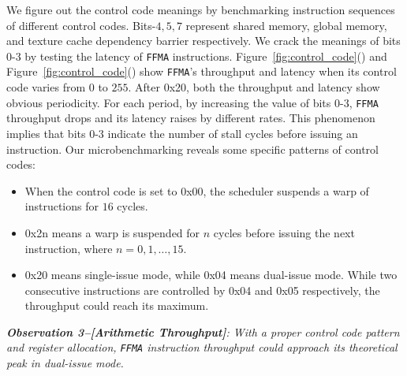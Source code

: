 We figure out the control code meanings by benchmarking instruction sequences of different control codes.
Bits-$4, 5, 7$ represent shared memory, global memory, and texture cache dependency barrier respectively.
We crack the meanings of bits $0$-$3$ by testing the latency of {\tt FFMA} instructions.
Figure~\ref{fig:control_code}() and
Figure~\ref{fig:control_code}() show {\tt FFMA}'s throughput and latency when its control code varies from $0$ to $255$.
After 0x20, both the throughput and latency show obvious periodicity.
For each period, by increasing the value of bits $0$-$3$, {\tt FFMA} throughput drops and its latency raises by different rates. 
This phenomenon implies that bits $0$-$3$ indicate the number of stall cycles before issuing
an instruction.
Our microbenchmarking reveals some specific patterns of control codes:

\begin{itemize}
\item When the control code is set to 0x00, the scheduler suspends a warp of instructions for $16$ cycles.
\item 0x2n means a warp is suspended for $n$ cycles before issuing the next instruction, where $n=0, 1,\dots, 15$.
\item 0x20 means single-issue mode, while 0x04 means dual-issue mode.
While two consecutive instructions are controlled by 0x04 and 0x05 respectively, the throughput could reach its maximum.
\end{itemize}

{\em {\bf Observation 3--[Arithmetic Throughput]}:
With a proper control code pattern and register allocation, {\tt FFMA}
instruction throughput could approach its theoretical peak in dual-issue mode.}

